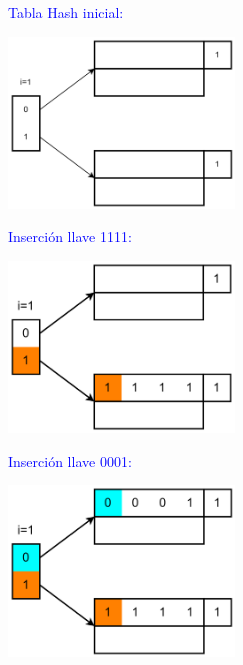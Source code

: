 \documentclass{templateNote}
\begin{document}
\begin{enumerate}
    \textcolor{blue}{Tabla Hash inicial:}
    \begin{center}
        \includegraphics[width=0.45\textwidth]{diagram/E7.png}
    \end{center}
    \textcolor{blue}{Inserci\'on llave 1111:}
    \begin{center}
        \includegraphics[width=0.45\textwidth]{diagram/E7-1.png}
    \end{center}
    \textcolor{blue}{Inserci\'on llave 0001:}
    \begin{center}
        \includegraphics[width=0.45\textwidth]{diagram/E7-2.png}
    \end{center}


\end{enumerate}
\end{document}
